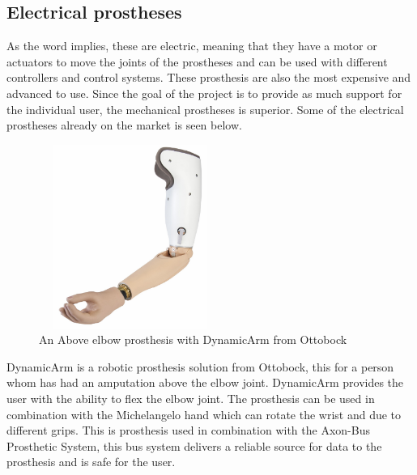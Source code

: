 \subsection*{Electrical prostheses}
As the word implies, these are electric, meaning that they have a motor or actuators to move the joints of the prostheses and can be used with different controllers and control systems. These prosthesis are also the most expensive and advanced to use. Since the goal of the project is to provide as much support for the individual user, the mechanical prostheses is superior. Some of the electrical prostheses already on the market is seen below.
\begin{figure}[H]
    \centering
    \includegraphics[width=6cm,height=6cm]{Figures/Contextual_figures/ProsthesesPics/dynamixarm.PNG}
    \caption{An Above elbow prosthesis with DynamicArm from Ottobock\cite{OttobockAB} }
    \label{fig:DynaArm}
\end{figure}
DynamicArm is a robotic prosthesis solution from Ottobock, this for a person whom has had an amputation above the elbow joint. DynamicArm provides the user with the ability to flex the elbow joint\cite{OttobockAB}. The prosthesis can be used in combination with the Michelangelo hand which can rotate the wrist and due to different grips\cite{OttobockM}. This is prosthesis used in combination with the Axon-Bus Prosthetic System, this bus system delivers a reliable source for data to the prosthesis and is safe for the user\cite{OttobockAX}.\\
